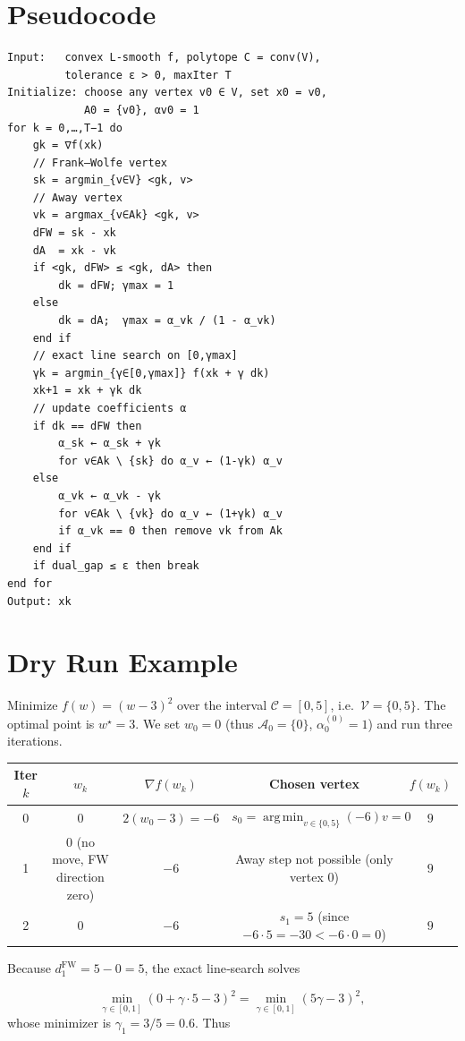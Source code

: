 \documentclass{article}
\newcommand{\argmin}{\operatorname*{arg\,min}}
\newcommand{\poly}{\mathcal{C}}
\newcommand{\grad}{\nabla}
\begin{document}
\section*{Pseudocode}
\begin{verbatim}
Input:   convex L‑smooth f, polytope C = conv(V), 
         tolerance ε > 0, maxIter T
Initialize: choose any vertex v0 ∈ V, set x0 = v0,
            A0 = {v0}, αv0 = 1
for k = 0,…,T−1 do
    gk = ∇f(xk)
    // Frank–Wolfe vertex
    sk = argmin_{v∈V} <gk, v>
    // Away vertex
    vk = argmax_{v∈Ak} <gk, v>
    dFW = sk - xk
    dA  = xk - vk
    if <gk, dFW> ≤ <gk, dA> then
        dk = dFW; γmax = 1
    else
        dk = dA;  γmax = α_vk / (1 - α_vk)
    end if
    // exact line search on [0,γmax]
    γk = argmin_{γ∈[0,γmax]} f(xk + γ dk)
    xk+1 = xk + γk dk
    // update coefficients α
    if dk == dFW then
        α_sk ← α_sk + γk
        for v∈Ak \ {sk} do α_v ← (1-γk) α_v
    else
        α_vk ← α_vk - γk
        for v∈Ak \ {vk} do α_v ← (1+γk) α_v
        if α_vk == 0 then remove vk from Ak
    end if
    if dual_gap ≤ ε then break
end for
Output: xk
\end{verbatim}

\section*{Dry Run Example}
Minimize $f(w)=(w-3)^2$ over the interval $\poly=[0,5]$, i.e.\ 
$\mathcal{V}=\{0,5\}$.  The optimal point is $w^\star=3$.
We set $w_0=0$ (thus $\mathcal{A}_0=\{0\}$, $\alpha_0^{(0)}=1$) and run three iterations.

\begin{center}
\begin{tabular}{c|c|c|c|c}
Iter $k$ & $w_k$ & $\grad f(w_k)$ & Chosen vertex & $f(w_k)$\\\hline
0 & $0$ & $2(w_0-3) = -6$ & $s_0=\argmin_{v\in\{0,5\}}(-6)v =0$ &
$9$\\\hline
1 & $0$ (no move, FW direction zero) & $-6$ &
Away step not possible (only vertex $0$) &
$9$\\\hline
2 & $0$ & $-6$ &
$ s_1 =5$ (since $-6\cdot5=-30< -6\cdot0=0$) &
$9$\\\hline
\end{tabular}
\end{center}

Because $d^{\text{FW}}_1 = 5-0 =5$, the exact line‑search solves  

\[
\min_{\gamma\in[0,1]} (0+\gamma\cdot5-3)^2
= \min_{\gamma\in[0,1]} (5\gamma-3)^2,
\]
whose minimizer is $\gamma_1 = 3/5 =0.6$.  
Thus  
\end{document}
